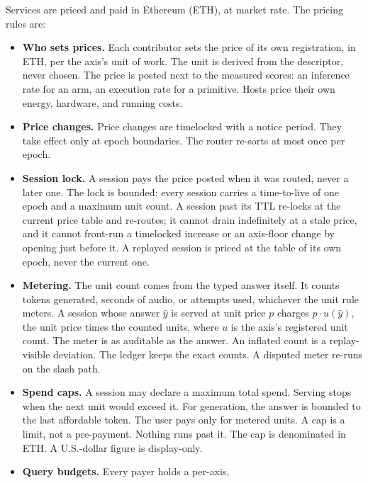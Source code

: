 \documentclass[11pt]{article}
\begin{document}
Services are priced and paid in Ethereum (ETH), at market rate.
The pricing rules are:
\begin{itemize}
    \item \textbf{Who sets prices.} Each contributor sets the price
          of its own registration, in ETH, per the axis's unit of work. The
          unit is derived from the descriptor, never chosen. The price is
          posted next to the measured scores: an inference rate for an arm,
          an execution rate for a primitive. Hosts price their own energy,
          hardware, and running costs.
    \item \textbf{Price changes.} Price changes are timelocked with a
          notice period. They take effect only at epoch boundaries. The
          router re-sorts at most once per epoch.
    \item \textbf{Session lock.} A session pays the price posted when
          it was routed, never a later one. The lock is bounded: every
          session carries a time-to-live of one epoch and a maximum unit
          count. A session past its TTL re-locks at the current price table
          and re-routes; it cannot drain indefinitely at a stale price,
          and it cannot front-run a timelocked increase or an axis-floor
          change by opening just before it. A replayed session is priced at
          the table of its own epoch, never the current one.
    \item \textbf{Metering.} The unit count comes from the typed
          answer itself. It counts tokens generated, seconds of audio, or
          attempts used, whichever the unit rule meters. A session whose
          answer $\hat y$ is served at unit price $p$ charges
          $p \cdot u(\hat y)$, the unit price times the counted units,
          where $u$ is the axis's registered unit count. The meter is
          as auditable as the answer. An inflated count is a replay-visible
          deviation. The ledger keeps the exact counts. A disputed meter
          re-runs on the slash path.
    \item \textbf{Spend caps.} A session may declare a maximum total
          spend. Serving stops when the next unit would exceed it. For
          generation, the answer is bounded to the last affordable token.
          The user pays only for metered units. A cap is a limit, not a
          pre-payment. Nothing runs past it. The cap is denominated in ETH.
          A U.S.-dollar figure is display-only.
    \item \textbf{Query budgets.} Every payer holds a per-axis,

\end{itemize}
\end{document}
